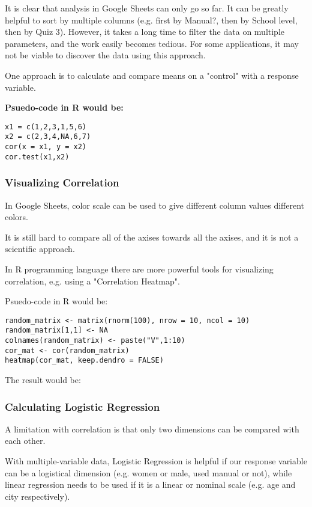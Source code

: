 It is clear that analysis in Google Sheets can only go so far. It can be greatly helpful to sort by multiple columns (e.g. first by Manual?, then by School level, then by Quiz 3). However, it takes a long time to filter the data on multiple parameters, and the work easily becomes tedious. For some applications, it may not be viable to discover the data using this approach.

One approach is to calculate and compare means on a "control"  with a response variable.

\textbf{Psuedo-code in R would be: }

\begin{verbatim}
x1 = c(1,2,3,1,5,6)
x2 = c(2,3,4,NA,6,7)
cor(x = x1, y = x2)
cor.test(x1,x2)
\end{verbatim}

\subsubsection{Visualizing Correlation}

In Google Sheets, color scale can be used to give different column values different colors.

It is still hard to compare all of the axises towards all the axises, and it is not a scientific approach.


In R programming language there are more powerful tools for visualizing correlation, e.g. using a "Correlation Heatmap".

Psuedo-code in R would be:

\begin{verbatim}
random_matrix <- matrix(rnorm(100), nrow = 10, ncol = 10)
random_matrix[1,1] <- NA
colnames(random_matrix) <- paste("V",1:10)
cor_mat <- cor(random_matrix)
heatmap(cor_mat, keep.dendro = FALSE)
\end{verbatim}

The result would be:


\subsubsection{Calculating Logistic Regression}

A limitation with correlation is that only two dimensions can be compared with each other.

With multiple-variable data, Logistic Regression is helpful if our response variable can be a logistical dimension (e.g. women or male, used manual or not), while linear regression needs to be used if it is a linear or nominal scale (e.g. age and city respectively).

